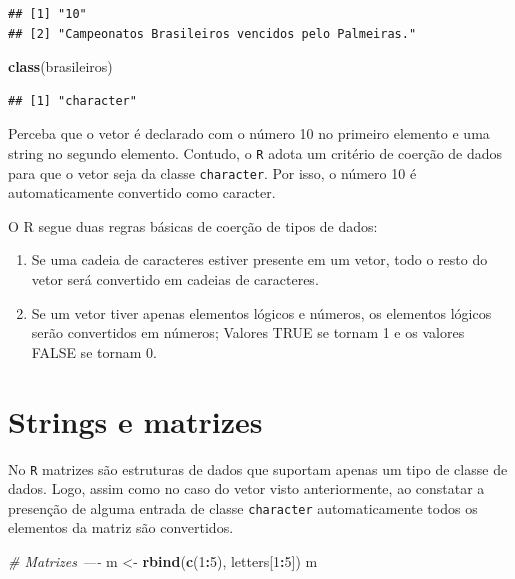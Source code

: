 \documentclass[]{book}
\newenvironment{Shaded}{\begin{snugshade}}{\end{snugshade}}
\newcommand{\CommentTok}[1]{\textcolor[rgb]{0.56,0.35,0.01}{\textit{#1}}}
\newcommand{\DecValTok}[1]{\textcolor[rgb]{0.00,0.00,0.81}{#1}}
\newcommand{\KeywordTok}[1]{\textcolor[rgb]{0.13,0.29,0.53}{\textbf{#1}}}
\newcommand{\NormalTok}[1]{#1}
\newcommand{\OperatorTok}[1]{\textcolor[rgb]{0.81,0.36,0.00}{\textbf{#1}}}
\newcommand{\StringTok}[1]{\textcolor[rgb]{0.31,0.60,0.02}{#1}}
\begin{document}
\begin{verbatim}
## [1] "10"                                              
## [2] "Campeonatos Brasileiros vencidos pelo Palmeiras."
\end{verbatim}

\begin{Shaded}
\begin{Highlighting}[]
\KeywordTok{class}\NormalTok{(brasileiros)}
\end{Highlighting}
\end{Shaded}

\begin{verbatim}
## [1] "character"
\end{verbatim}

Perceba que o vetor é declarado com o número 10 no primeiro elemento e uma string no segundo elemento. Contudo, o \texttt{R} adota um critério de coerção de dados para que o vetor seja da classe \texttt{character}. Por isso, o número 10 é automaticamente convertido como caracter.

O R segue duas regras básicas de coerção de tipos de dados:

\begin{enumerate}
\def\labelenumi{\arabic{enumi}.}
\item
  Se uma cadeia de caracteres estiver presente em um vetor, todo o resto do vetor será convertido em cadeias de caracteres.
\item
  Se um vetor tiver apenas elementos lógicos e números, os elementos lógicos serão convertidos em números; Valores TRUE se tornam 1 e os valores FALSE se tornam 0.
\end{enumerate}

\hypertarget{strings-e-matrizes}{%
\section{Strings e matrizes}\label{strings-e-matrizes}}

No \texttt{R} matrizes são estruturas de dados que suportam apenas um tipo de classe de dados. Logo, assim como no caso do vetor visto anteriormente, ao constatar a presenção de alguma entrada de classe \texttt{character} automaticamente todos os elementos da matriz são convertidos.

\begin{Shaded}
\begin{Highlighting}[]
\CommentTok{# Matrizes ----}
\NormalTok{m <-}\StringTok{ }\KeywordTok{rbind}\NormalTok{(}\KeywordTok{c}\NormalTok{(}\DecValTok{1}\OperatorTok{:}\DecValTok{5}\NormalTok{), letters[}\DecValTok{1}\OperatorTok{:}\DecValTok{5}\NormalTok{])}
\NormalTok{m}
\end{Highlighting}
\end{Shaded}
\end{document}
